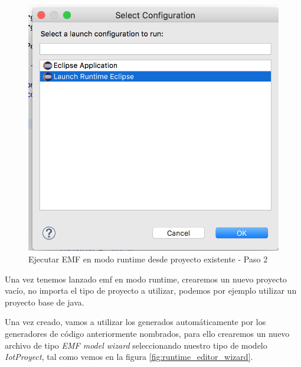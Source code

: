 \begin{figure}
	\centering
    \includegraphics[scale=0.4]{images/emf_capturas/runtime_emf_paso2}
    \sourcepropia{}
    \caption{Ejecutar EMF en modo runtime desde proyecto existente - Paso 2}
    \label{fig:runtime_emf_paso2}
\end{figure}


Una vez tenemos lanzado \gls{emf} en modo \gls{runtime}, crearemos un nuevo proyecto vacío, no importa el tipo de proyecto a utilizar, podemos por ejemplo utilizar un proyecto base de java.

Una vez creado, vamos a utilizar los  generados automáticamente por los generadores de código anteriormente nombrados, para ello crearemos un nuevo archivo de tipo \textit{EMF model wizard} seleccionando nuestro tipo de modelo \textit{IotProyect}, tal como vemos en la figura \ref{fig:runtime_editor_wizard}.

